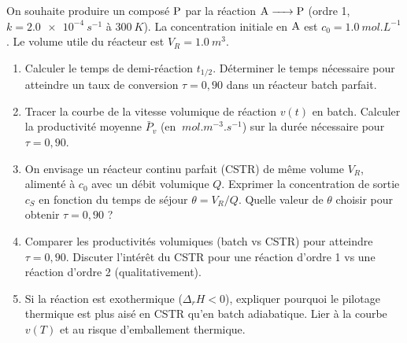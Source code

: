 \documentclass[11pt]{article}
\begin{document}
\begin{exercice}
On souhaite produire un composé $\ce{P}$ par la réaction $\ce{A -> P}$ (ordre 1, $k = \SI{2.0e-4}{s^{-1}}$ à $\SI{300}{K}$). La concentration initiale en $\ce{A}$ est $c_0 = \SI{1.0}{mol.L^{-1}}$. Le volume utile du réacteur est $V_R = \SI{1.0}{m^3}$.
\begin{enumerate}
    \item Calculer le temps de demi-réaction $t_{1/2}$. Déterminer le temps nécessaire pour atteindre un taux de conversion $\tau = 0,90$ dans un réacteur batch parfait.
    \item Tracer la courbe de la vitesse volumique de réaction $v(t)$ en batch. Calculer la productivité moyenne $\bar{P}_v$ (en $\SI{}{mol.m^{-3}.s^{-1}}$) sur la durée nécessaire pour $\tau = 0,90$.
    \item On envisage un réacteur continu parfait (CSTR) de même volume $V_R$, alimenté à $c_0$ avec un débit volumique $Q$. Exprimer la concentration de sortie $c_S$ en fonction du temps de séjour $\theta = V_R/Q$. Quelle valeur de $\theta$ choisir pour obtenir $\tau = 0,90$ ?
    \item Comparer les productivités volumiques (batch vs CSTR) pour atteindre $\tau = 0,90$. Discuter l'intérêt du CSTR pour une réaction d'ordre 1 vs une réaction d'ordre 2 (qualitativement).
    \item Si la réaction est exothermique ($\Delta_r H < 0$), expliquer pourquoi le pilotage thermique est plus aisé en CSTR qu'en batch adiabatique. Lier à la courbe $v(T)$ et au risque d'emballement thermique.
\end{enumerate}
\end{exercice}
\end{document}

